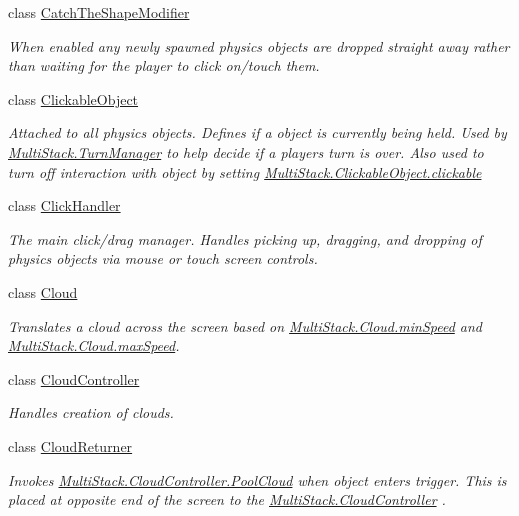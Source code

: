 \begin{DoxyCompactItemize}
class \hyperlink{class_multi_stack_1_1_catch_the_shape_modifier}{Catch\+The\+Shape\+Modifier}
\begin{DoxyCompactList}\small\item\em When enabled any newly spawned physics objects are dropped straight away rather than waiting for the player to click on/touch them. \end{DoxyCompactList}\item 
class \hyperlink{class_multi_stack_1_1_clickable_object}{Clickable\+Object}
\begin{DoxyCompactList}\small\item\em Attached to all physics objects. Defines if a object is currently being held. Used by \hyperlink{class_multi_stack_1_1_turn_manager}{Multi\+Stack.\+Turn\+Manager} to help decide if a players turn is over. Also used to turn off interaction with object by setting \hyperlink{class_multi_stack_1_1_clickable_object_a9fbbe82e73f95769344946b8b39e2520}{Multi\+Stack.\+Clickable\+Object.\+clickable} \end{DoxyCompactList}\item 
class \hyperlink{class_multi_stack_1_1_click_handler}{Click\+Handler}
\begin{DoxyCompactList}\small\item\em The main click/drag manager. Handles picking up, dragging, and dropping of physics objects via mouse or touch screen controls. \end{DoxyCompactList}\item 
class \hyperlink{class_multi_stack_1_1_cloud}{Cloud}
\begin{DoxyCompactList}\small\item\em Translates a cloud across the screen based on \hyperlink{class_multi_stack_1_1_cloud_a41c5aba0ae109496d637a7e08c726171}{Multi\+Stack.\+Cloud.\+min\+Speed} and \hyperlink{class_multi_stack_1_1_cloud_ad665595ffaaa5c7b5c6d5a7222d40c89}{Multi\+Stack.\+Cloud.\+max\+Speed}. \end{DoxyCompactList}\item 
class \hyperlink{class_multi_stack_1_1_cloud_controller}{Cloud\+Controller}
\begin{DoxyCompactList}\small\item\em Handles creation of clouds. \end{DoxyCompactList}\item 
class \hyperlink{class_multi_stack_1_1_cloud_returner}{Cloud\+Returner}
\begin{DoxyCompactList}\small\item\em Invokes \hyperlink{class_multi_stack_1_1_cloud_controller_a10db53c6e52758567af0bcaf8394b43d}{Multi\+Stack.\+Cloud\+Controller.\+Pool\+Cloud} when object enters trigger. This is placed at opposite end of the screen to the \hyperlink{class_multi_stack_1_1_cloud_controller}{Multi\+Stack.\+Cloud\+Controller} . \end{DoxyCompactList}\item 

\end{DoxyCompactItemize}
